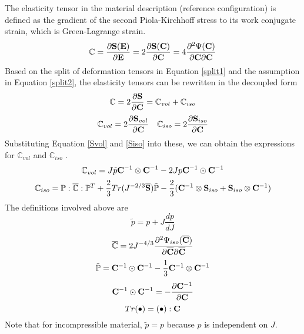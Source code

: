 The elasticity tensor in the material description (reference configuration) is defined as the gradient of the second Piola-Kirchhoff stress to its work conjugate strain, which is Green-Lagrange strain.
\begin{equation}
\mathbb{C} = \frac{\partial{\bold{S}(\bold{E})}}{\partial{\bold{E}}} =  2\frac{\partial{\bold{S}(\bold{C})}} {\partial{\bold{C}}} = 4 \frac{\partial^2{\Psi(\bold{C})}}{{\partial{\bold{C}}}{\partial{\bold{C}}}}
\end{equation}
Based on the split of deformation tensors in Equation \ref{split1} and the assumption in Equation \ref{split2}, the elasticity tensors can be rewritten in the decoupled form
\begin{equation}
\mathbb{C} = 2\frac{\partial{\bold{S}}}{\partial{\bold{C}}} = \mathbb{C}_{vol} + \mathbb{C}_{iso} 
\end{equation}
\begin{equation}
\mathbb{C}_{vol} = 2\frac{\partial{\bold{S}_{vol}}}{\partial{\bold{C}}}
\quad
\mathbb{C}_{iso} = 2\frac{\partial{\bold{S}_{iso}}}{\partial{\bold{C}}}
\end{equation}
Substituting Equation \ref{Svol} and \ref{Siso}  into these, we can obtain the expressions for $\mathbb{C}_{vol}$ and $\mathbb{C}_{iso}$ .
\begin{equation}
\mathbb{C}_{vol} = J\tilde{p}\bold{C}^{-1}\otimes\bold{C}^{-1} - 2Jp\bold{C}^{-1}\odot\bold{C}^{-1}
\end{equation}
\begin{equation}
\mathbb{C}_{iso} = \mathbb{P} : \overline{\mathbb{C}} : \mathbb{P}^T + \frac{2}{3}Tr(J^{-2/3}\overline{\bold{S}})\tilde{\mathbb{P}} - \frac{2}{3}(\bold{C}^{-1}\otimes\bold{S}_{iso} + \bold{S}_{iso}\otimes \bold{C}^{-1})
\end{equation}
The definitions involved above are
\begin{equation}
\tilde{p} = p + J\frac{dp}{dJ}
\end{equation}
\begin{equation}
\overline{\mathbb{C}} = 2J^{-4/3}\frac{\partial^2\Psi_{iso}(\overline{\bold{C}})}{\partial{\overline{\bold{C}}}{\partial{\overline{\bold{C}}}}}
\end{equation}
\begin{equation}
\tilde{\mathbb{P}} = \bold{C}^{-1} \odot \bold{C}^{-1} -  \frac{1}{3}\bold{C}^{-1} \otimes \bold{C}^{-1} 
\end{equation}
\begin{equation}
\bold{C}^{-1}\odot\bold{C}^{-1} = - \frac{\partial{\bold{C}^{-1}}}{\partial{\bold{C}}}
\end{equation}
\begin{equation}
Tr(\bullet) = (\bullet) : \bold{C}
\end{equation}
Note that for incompressible material, $\tilde{p} = p$ because $p$ is independent on $J$.


